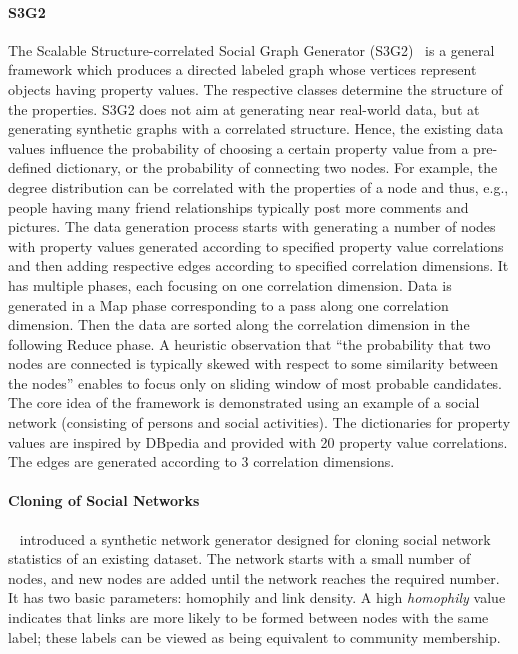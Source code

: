 \paragraph{S3G2} The Scalable Structure-correlated Social Graph Generator (S3G2)~\cite{Pham2013} is a general framework which produces a directed labeled graph whose vertices represent objects having property values. The respective classes determine the structure of the properties. S3G2 does not aim at generating near real-world data, but at generating synthetic graphs with a correlated structure. Hence, the existing data values influence the probability of choosing a certain property value from a pre-defined dictionary, or the probability of connecting two nodes. For example, the degree distribution can be correlated with the properties of a node and thus, e.g., people having many friend relationships typically post more comments and pictures. The data generation process starts with generating a number of nodes with property values generated according to specified property value correlations and then adding respective edges according to specified correlation dimensions. It has multiple phases, each focusing on one correlation dimension. Data is generated in a Map phase corresponding to a pass along one correlation dimension. Then the data are sorted along the correlation dimension in the following Reduce phase. A heuristic observation that ``the probability that two nodes are connected is typically skewed with respect to some similarity between the nodes'' enables to focus only on sliding window of most probable candidates. The core idea of the framework is demonstrated using an example of a social network (consisting of persons and social activities).  The dictionaries for property values are inspired by DBpedia and provided with 20 property value correlations. The edges are generated according to 3 correlation dimensions.


\paragraph{Cloning of Social Networks} ~\cite{Sukthankar-SocialInfo2014}
introduced a synthetic network generator designed for cloning social network
statistics of an existing dataset. The network starts with a small number of
nodes, and new nodes are added until the network reaches the required number. It
has two basic parameters: homophily and link density. A high \emph{homophily}
value indicates that links are more likely to be formed between nodes with the
same label; these labels can be viewed as being equivalent to community
membership.

